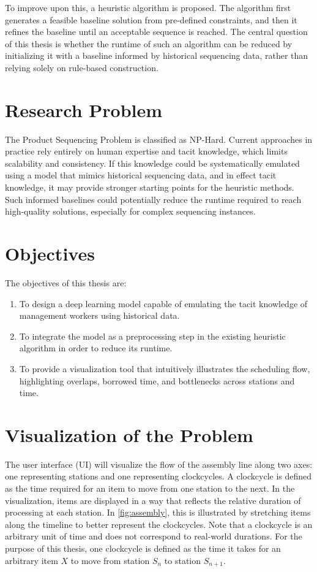 \documentclass[12pt,a4paper]{report}
\begin{document}
To improve upon this, a heuristic algorithm is proposed. The algorithm first generates a feasible baseline solution from pre-defined constraints, and then it refines the baseline until an acceptable sequence is reached. The central question of this thesis is whether the runtime of such an algorithm can be reduced by initializing it with a baseline informed by historical sequencing data, rather than relying solely on rule-based construction.

\section{Research Problem}
The Product Sequencing Problem is classified as NP-Hard. Current approaches in practice rely entirely on human expertise and tacit knowledge, which limits scalability and consistency. If this knowledge could be systematically emulated using a model that mimics historical sequencing data, and in effect tacit knowledge, it may provide stronger starting points for the heuristic methods. Such informed baselines could potentially reduce the runtime required to reach high-quality solutions, especially for complex sequencing instances.

\section{Objectives}
The objectives of this thesis are:
\begin{enumerate}
    \item To design a deep learning model capable of emulating the tacit knowledge of management workers using historical data.
    \item To integrate the model as a preprocessing step in the existing heuristic algorithm in order to reduce its runtime.
    \item To provide a visualization tool that intuitively illustrates the scheduling flow, highlighting overlaps, borrowed time, and bottlenecks across stations and time.
\end{enumerate}

\section{Visualization of the Problem}

The user interface (UI) will visualize the flow of the assembly line along two axes: one representing stations and one representing clockcycles. A clockcycle is defined as the time required for an item to move from one station to the next. In the visualization, items are displayed in a way that reflects the relative duration of processing at each station. In \autoref{fig:assembly}, this is illustrated by stretching items along the timeline to better represent the clockcycles. Note that a clockcycle is an arbitrary unit of time and does not correspond to real-world durations. For the purpose of this thesis, one clockcycle is defined as the time it takes for an arbitrary item $X$ to move from station $S_n$ to station $S_{n+1}$.
\end{document}
